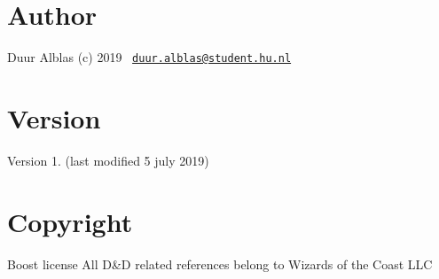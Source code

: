 \hypertarget{index_Author}{}\section{Author}\label{index_Author}
Duur Alblas (c) 2019~\newline
\href{mailto:duur.alblas@student.hu.nl}{\tt duur.\+alblas@student.\+hu.\+nl} \hypertarget{index_Version}{}\section{Version}\label{index_Version}
Version 1. (last modified 5 july 2019) \hypertarget{index_Copyright}{}\section{Copyright}\label{index_Copyright}
Boost license All D\&D related references belong to Wizards of the Coast L\+LC 
